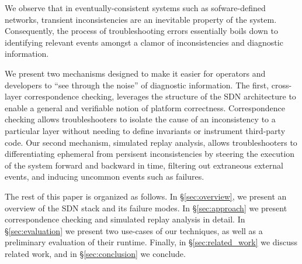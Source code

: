 We observe that in eventually-consistent systems such as sofware-defined networks,
transient inconsistencies are an inevitable property of the system.
Consequently, the process of troubleshooting errors essentially boils down to
identifying relevant events amongst a clamor of inconsistencies and diagnostic
information.

We present two mechanisms designed to make it easier for operators and
developers to ``see through the noise'' of diagnostic information. The first,
cross-layer correspondence checking, leverages the structure of the SDN
architecture to enable a general and verifiable notion of platform
correctness. Correspondence checking allows troubleshooters to isolate the cause of 
an inconsistency to a particular layer without needing to define invariants or
instrument third-party code. Our second
mechanism, simulated replay analysis, allows troubleshooters 
to differentiating ephemeral from persisent inconsistencies by steering the
execution of the system forward and backward in time, filtering out extraneous
external events, and inducing uncommon events such as failures. 

The rest of this paper is organized as follows. In \S\ref{sec:overview},
we present an overview of the SDN stack and its failure modes.
In \S\ref{sec:approach} we present correspondence checking and simulated
replay analysis in detail. In \S\ref{sec:evaluation} we present
two use-cases of our techniques, as well as a preliminary evaluation
of their runtime. Finally, in \S\ref{sec:related_work} we discuss related work,
and in \S\ref{sec:conclusion} we conclude.

